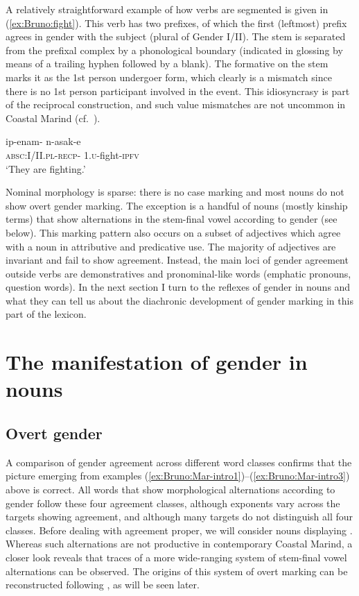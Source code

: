 \documentclass[output=collectionpaper]{langsci/langscibook}
\begin{document}
A relatively straightforward example of how verbs are segmented is given in (\ref{ex:Bruno:fight}). This verb has two prefixes, of which the first (leftmost) prefix agrees in gender with the subject (plural of Gender I/II). The stem is separated from the prefixal complex by a phonological boundary (indicated in glossing by means of a trailing hyphen followed by a blank). The formative  on the stem marks it as the 1st person undergoer form, which clearly is a mismatch since there is no 1st person participant involved in the event. This idiosyncrasy is part of the reciprocal construction, and such value mismatches are not uncommon in Coastal Marind (cf.\ ).

\ea\label{ex:Bruno:fight}
\gll ip-enam- n-asak-e\\
\textsc{absc}:I/II.\textsc{pl}-\textsc{recp}- 1.\textsc{u}-fight-\textsc{ipfv}\\
\glt `They are fighting.'
\z

Nominal morphology is sparse: there is no case marking and most nouns do not show overt gender marking. The exception is a handful of nouns (mostly kinship terms) that show alternations in the stem-final vowel according to gender (see below). This marking pattern also occurs on a subset of adjectives which agree with a noun in attributive and predicative use. The majority of adjectives are invariant and fail to show agreement. Instead, the main loci of gender agreement outside verbs are demonstratives and pronominal-like words (emphatic pronouns, question words). In the next section I turn to the reflexes of gender in nouns and what they can tell us about the diachronic development of gender marking in this part of the lexicon.

\section{The manifestation of gender in nouns}
\label{sec:Bruno:4genders}
\subsection{Overt gender}
\label{sec:Bruno:2.1}
A comparison of gender agreement across different word classes confirms that the picture emerging from examples (\ref{ex:Bruno:Mar-intro1})--(\ref{ex:Bruno:Mar-intro3}) above is correct. All words that show morphological alternations according to gender follow these four agreement classes, although exponents vary across the targets showing agreement, and although many targets do not distinguish all four classes. Before dealing with agreement proper, we will consider nouns displaying . Whereas such alternations are not productive in contemporary Coastal Marind, a closer look reveals that traces of a more wide-ranging system of stem-final vowel alternations can be observed. The origins of this system of overt marking can be reconstructed following \cite{Usher2015}, as will be seen later.
\end{document}
